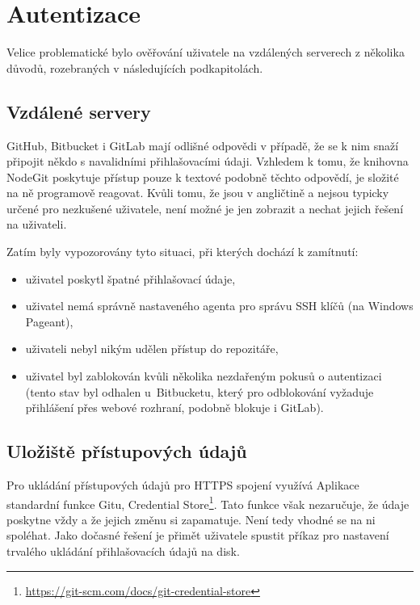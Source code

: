 \section{Autentizace}

Velice problematické bylo ověřování uživatele na vzdálených serverech z několika důvodů, rozebraných v následujících podkapitolách.

\subsection{Vzdálené servery}

GitHub, Bitbucket i GitLab mají odlišné odpovědi v případě, že se k nim snaží připojit někdo s navalidními přihlašovacími údaji. Vzhledem k tomu, že knihovna NodeGit poskytuje přístup pouze k textové podobně těchto odpovědí, je složité na ně programově reagovat. Kvůli tomu, že jsou v angličtině a nejsou typicky určené pro nezkušené uživatele, není možné je jen zobrazit a nechat jejich řešení na uživateli.

Zatím byly vypozorovány tyto situaci, při kterých dochází k zamítnutí:

\begin{itemize}
	\item uživatel poskytl špatné přihlašovací údaje,
	\item uživatel nemá správně nastaveného agenta pro správu SSH klíčů (na Windows Pageant),
	\item uživateli nebyl nikým udělen přístup do repozitáře,
	\item uživatel byl zablokován kvůli několika nezdařeným pokusů o autentizaci (tento stav byl odhalen u~Bitbucketu, který pro odblokování vyžaduje přihlášení přes webové rozhraní, podobně blokuje i GitLab).
\end{itemize}

\subsection{Uložiště přístupových údajů}

Pro ukládání přístupových údajů pro HTTPS spojení využívá Aplikace standardní funkce Gitu, Credential Store\footnote{\url{https://git-scm.com/docs/git-credential-store}}. Tato funkce však nezaručuje, že údaje poskytne vždy a že jejich změnu si zapamatuje. Není tedy vhodné se na ni spoléhat. Jako dočasné řešení je přimět uživatele spustit příkaz pro nastavení trvalého ukládání přihlašovacích údajů na disk.

